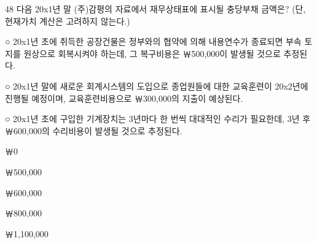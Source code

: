 \begin{question}{48}
다음 20x1년 말 (주)감평의 자료에서 재무상태표에 표시될 충당부채 금액은? (단, 현재가치 계산은 고려하지 않는다.)
\begin{framedtext}
○ 20x1년 초에 취득한 공장건물은 정부와의 협약에 의해 내용연수가 종료되면 부속 토지를 원상으로 회복시켜야 하는데, 그 복구비용은 ￦500,000이 발생될 것으로 추정된다. \par
○ 20x1년 말에 새로운 회계시스템의 도입으로 종업원들에 대한 교육훈련이 20x2년에 진행될 예정이며, 교육훈련비용으로 ￦300,000의 지출이 예상된다. \par
○ 20x1년 초에 구입한 기계장치는 3년마다 한 번씩 대대적인 수리가 필요한데, 3년 후 ￦600,000의 수리비용이 발생될 것으로 추정된다.
\end{framedtext}
\begin{choices}
  \item ￦0
  \item ￦500,000
  \item ￦600,000
  \item ￦800,000
  \item ￦1,100,000
\end{choices}
\end{question}
